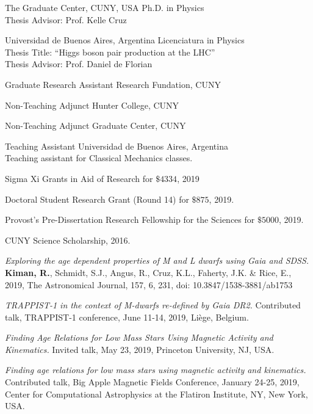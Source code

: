 \documentclass[10pt]{cv}
\begin{document}
\begin{llist}

The Graduate Center, CUNY, USA
Ph.D. in Physics\\
Thesis Advisor: Prof. Kelle Cruz

Universidad de Buenos Aires, Argentina
Licenciatura in Physics\\
Thesis Title: ``Higgs boson pair production at the LHC''\\
Thesis Advisor: Prof. Daniel de Florian


Graduate Research Assistant
Research Fundation, CUNY

Non-Teaching Adjunct
Hunter College, CUNY

Non-Teaching Adjunct
Graduate Center, CUNY

Teaching Assistant
Universidad de Buenos Aires, Argentina\\
Teaching assistant for Classical Mechanics classes.


Sigma Xi Grants in Aid of Research for $\$4334$, 2019

Doctoral Student Research Grant (Round 14) for $\$875$, 2019.

Provost’s Pre-Dissertation Research Fellowship for the Sciences for $\$5000$, 2019.

CUNY Science Scholarship, 2016.


\textit{Exploring the age dependent properties of M and L dwarfs using \textit{Gaia} and SDSS.} \textbf{Kiman, R.}, Schmidt, S.J., Angus, R., Cruz, K.L., Faherty, J.K. \& Rice, E., 2019, The Astronomical Journal, 157, 6, 231, doi: 10.3847/1538-3881/ab1753 


\textit{TRAPPIST-1 in the context of M-dwarfs re-defined by Gaia DR2.} Contributed talk, TRAPPIST-1 conference, June 11-14, 2019, Li\`ege, Belgium.

\textit{Finding Age Relations for Low Mass Stars Using Magnetic Activity and Kinematics.} Invited talk, May 23, 2019, Princeton University, NJ, USA. 

\textit{Finding age relations for low mass stars using magnetic activity and kinematics.} Contributed talk, Big Apple Magnetic Fields Conference, January 24-25, 2019, Center for Computational Astrophysics at the Flatiron Institute, NY, New York, USA. 


\end{llist}
\end{document}
